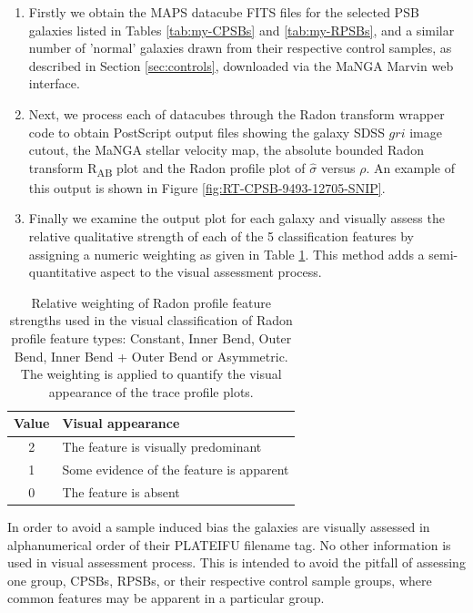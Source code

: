 \begin{enumerate}
    \item Firstly we obtain the MAPS datacube FITS files for the selected PSB galaxies listed in Tables \ref{tab:my-CPSBs} and \ref{tab:my-RPSBs}, and a similar number of 'normal' galaxies drawn from their respective control samples, as described in Section \ref{sec:controls}, downloaded via the MaNGA Marvin web interface.
    \item Next, we process each of datacubes through the Radon transform wrapper code to obtain PostScript output files showing the galaxy SDSS $gri$ image cutout, the MaNGA stellar velocity map, the absolute bounded Radon transform R\textsubscript{AB} plot and the Radon profile plot of $\hat{\sigma}$ versus $\rho$. An example of this output is shown in Figure \ref{fig:RT-CPSB-9493-12705-SNIP}. 
    \item  Finally we examine the output plot for each galaxy and visually assess the relative qualitative strength of each of the 5 classification features by assigning a numeric weighting as given in Table \ref{tab:features}. This method adds a semi-quantitative aspect to the visual assessment process.
\end{enumerate}

\begin{table}
    \centering
    \begin{tabular}{cl}
    \hline
    Value & Visual appearance \\
    \hline
    2 & The feature is visually predominant \\
    1 & Some evidence of the feature is apparent \\
    0 & The feature is absent \\
    \hline
    \end{tabular}
    \caption{Relative weighting of Radon profile feature strengths used in the  visual classification of Radon profile feature types: Constant, Inner Bend, Outer Bend, Inner Bend + Outer Bend or Asymmetric. The weighting is applied to quantify the visual appearance of the trace profile plots.}
    \label{tab:features}
\end{table}

In order to avoid a sample induced bias the galaxies are visually assessed in alphanumerical order of their PLATEIFU filename tag. No other information is used in visual assessment process. This is intended to avoid the pitfall of assessing one group, CPSBs, RPSBs, or their respective control sample groups, where common features may be apparent in a particular group. 

